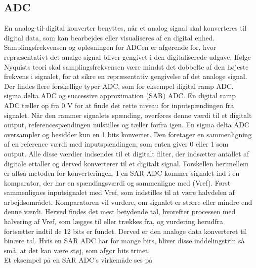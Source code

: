 \subsection{ADC}
En analog-til-digital konverter benyttes, når et analog signal skal konverteres til digital data, som kan bearbejdes eller visualiseres af en digital enhed. Samplingsfrekvensen og opløsningen for ADCen er afgørende for, hvor repræsentativt det analge signal bliver gengivet i den digitaliserede udgave. Ifølge Nyquists teori skal samplingsfrekvensen være mindst det dobbelte af den højeste frekvens i signalet, for at sikre en repræsentativ gengivelse af det analoge signal. Der findes flere forskellige typer ADC, som for eksempel digital ramp ADC, sigma delta ADC og successive approximation (SAR) ADC. En digital ramp ADC tæller op fra 0 V for at finde det rette niveau for inputspændingen fra signalet. Når den rammer signalets spænding, overføres denne værdi til et digitalt output, referencespændingen nulstilles og tæller forfra igen. En sigma delta ADC oversampler og besidder kun en 1 bits konverter. Den foretager en sammenligning af en reference værdi med inputspændingen, som enten giver 0 eller 1 som output. Alle disse værdier indsendes til et digitalt filter, der indsætter antallet af digitale ettaller og derved konverterer til et digitalt signal. Forskellen herimellem er altså metoden for konverteringen. I en SAR ADC kommer signalet ind i en komparator, der har en spændingsværdi og sammenligne med (Vref). Først sammenlignes inputsignalet med Vref, som indstilles til at være halvdelen af arbejdsområdet. Komparatoren vil vurdere, om signalet er større eller mindre end denne værdi. Herved findes det mest betydende tal, hvorefter processen med halvering af Vref, som lægges til eller trækkes fra, og vurdering herudfra fortsætter indtil de 12 bits er fundet. Derved er den analoge data konverteret til binære tal. Hvis en SAR ADC har for mange bits, bliver disse inddelingstrin så små, at det kan være støj, som afgør bits trinet. \citep{Moore2004,Sheingold2014} \\
Et eksempel på en SAR ADC's virkemåde ses på 
